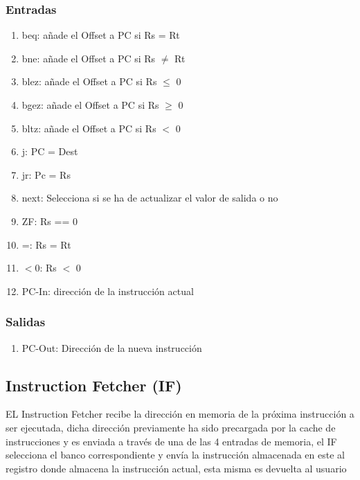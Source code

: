\documentclass{article}
\begin{document}
            \subsubsection{Entradas}
            \begin{enumerate}
                \item beq: a\~nade el Offset a PC si Rs = Rt
                \item bne: a\~nade el Offset a PC si Rs $\not =$ Rt
                \item blez: a\~nade el Offset a PC si Rs $\leq$ 0
                \item bgez: a\~nade el Offset a PC si Rs $\geq$ 0
                \item bltz: a\~nade el Offset a PC si Rs $<$ 0
                \item j: PC = Dest
                \item jr: Pc = Rs
                \item next: Selecciona si se ha de actualizar el valor de salida o no
                \item ZF: Rs == 0
                \item =: Rs = Rt
                \item $<0$: Rs $<$ 0 
                \item PC-In: direcci\'on de la instrucci\'on actual
            \end{enumerate}
            
            \subsubsection{Salidas}
            \begin{enumerate}
                \item PC-Out: Direcci\'on de la nueva instrucci\'on
            \end{enumerate}    

        \subsection{Instruction Fetcher (IF)} 
        \label{sec:IF}
            EL Instruction Fetcher recibe la direcci\'on en memoria de la pr\'oxima instrucci\'on a ser ejecutada, dicha direcci\'on previamente ha sido precargada 
            por la cache de instrucciones y es enviada a trav\'es de una de las 4 entradas de memoria, el IF selecciona el banco correspondiente y env\'ia la instrucci\'on almacenada en este al registro donde almacena la instrucci\'on actual, esta misma es devuelta al usuario
\end{document}
